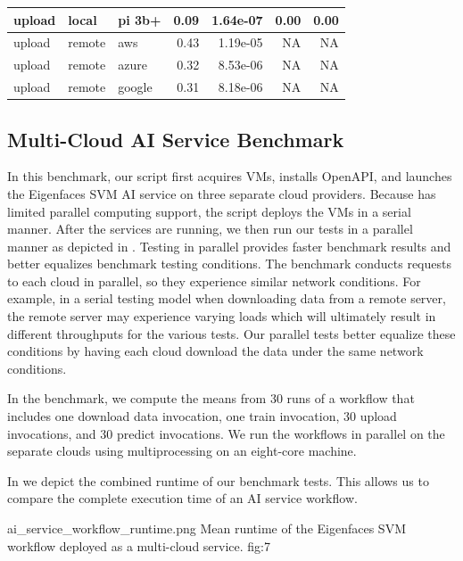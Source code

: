 \begin{table}[htb]
{\begin{tabular}{lllrrrr}
            upload &   local &    pi 3b+ &    0.09 & 1.64e-07 &                0.00 &             0.00 \\
\midrule
            upload &  remote &       aws &    0.43 & 1.19e-05 &                 NA &              NA \\
            upload &  remote &     azure &    0.32 & 8.53e-06 &                 NA &              NA \\
            upload &  remote &    google &    0.31 & 8.18e-06 &                 NA &              NA \\
\bottomrule
\end{tabular}
}
\end{table}

\subsection{Multi-Cloud AI Service Benchmark}
\label{sec-multi-benchmark}

In this benchmark, our script first acquires VMs, installs \Cloudmesh
OpenAPI, and launches the Eigenfaces SVM AI service on three separate
cloud providers. Because \Cloudmesh has limited parallel computing
support, the script deploys the VMs in a serial manner. After the
services are running, we then run our tests in a parallel manner as
depicted in . Testing in parallel provides faster
benchmark results and better equalizes benchmark testing
conditions. The benchmark conducts requests to each cloud in parallel,
so they experience similar network conditions. For example, in a
serial testing model when downloading data from a remote server, the
remote server may experience varying loads which will ultimately
result in different throughputs for the various tests. Our parallel
tests better equalize these conditions by having each cloud download
the data under the same network conditions.

In the benchmark, we compute the means from 30 runs of a workflow that
includes one download data invocation, one train invocation, 30 upload
invocations, and 30 predict invocations. We run the workflows in
parallel on the separate clouds using multiprocessing on an eight-core
machine.

In  we depict the combined runtime of our benchmark
tests. This allows us to compare the complete execution time of an AI
service workflow.

\OneFIGURE
    {ai_service_workflow_runtime.png}
    {Mean runtime of the Eigenfaces SVM workflow deployed
     as a multi-cloud service.}
    {fig:7}

